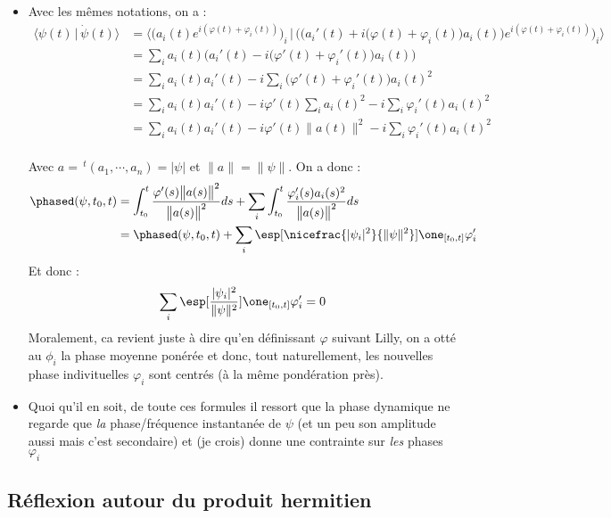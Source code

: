 \begin{itemize}
	\item Avec les mêmes notations, on a :
	\begin{align*}
		\big\langle \psi(t) \,|\, \dot{\psi}(t) \big\rangle &= \Big\langle \Big(a_i(t)e^{i(\varphi(t)+\varphi_i(t))}\Big)_i \,\Big|\, \Big(\big(a_i'(t)+i\big( \varphi(t)+\varphi_i(t) \big)a_i(t)\big)e^{i(\varphi(t)+\varphi_i(t))}\Big)_i \Big\rangle \\
		&= \sum_i a_i(t) \Big(a_i'(t)-i\big(\varphi'(t) + \varphi_i'(t)\big)a_i(t)\Big) \\
		&= \sum_i a_i(t)a_i'(t)-i\sum_i \big(\varphi'(t) + \varphi_i'(t)\big)a_i(t)^2 \\
		&= \sum_i a_i(t)a_i'(t)-i \varphi'(t)\sum_ia_i(t)^2  - i\sum_i \varphi_i'(t)a_i(t)^2 \\
		&= \sum_i a_i(t)a_i'(t)-i \varphi'(t)\big\|a(t)\big\|^2  - i\sum_i \varphi_i'(t)a_i(t)^2
	\end{align*}
	\\
	Avec $a =\, ^t(a_1,\cdots, a_n)= |\psi|$ et $\|a\|=\|\psi\|$. On a donc :
	\begin{align*}
		\phased(\psi,t_0,t) &= \int_{t_0}^t \frac{\varphi'(s)\big\|a(s)\big\|^2}{\big\|a(s)\big\|^2} ds  + \sum_i\int_{t_0}^t \frac{\varphi_i'(s)a_i(s)^2}{\big\|a(s)\big\|^2} ds \\
		&=\phased(\psi,t_0,t)  + \sum_i \esp[\nicefrac{|\psi_i|^2}{\|\psi\|^2}]{\one_{[t_0,t]}\varphi_i'}
	\end{align*}
	Et donc :
	\begin{equation}\label{eq:sum_esp_null}
		\sum_i \esp[\frac{|\psi_i|^2}{\|\psi\|^2}]{\one_{[t_0,t]}\varphi_i'} = 0
	\end{equation}
	Moralement, ca revient juste à dire qu'en définissant $\varphi$ suivant Lilly, on a otté au $\phi_i$ la phase moyenne ponérée et donc, tout naturellement, les nouvelles phase indivituelles $\varphi_i$ sont centrés (à la même pondération près).
	
	\item Quoi qu'il en soit, de toute ces formules il ressort que la phase dynamique ne regarde que \textit{la} phase/fréquence instantanée de $\psi$ (et un peu son amplitude aussi mais c'est secondaire) et (je crois) donne une contrainte sur \textit{les} phases $\varphi_i$
\end{itemize}\subsection{Réflexion autour du produit hermitien}


